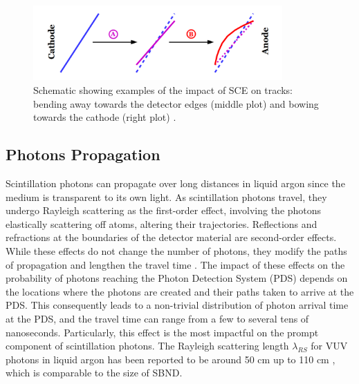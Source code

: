 \begin{figure}[htbp] 
\centering    
\includegraphics[width=0.85\textwidth]{SCE}
\caption[SCE]{
Schematic showing examples of the impact of SCE on tracks: bending away towards the detector edges (middle plot) and bowing towards the cathode (right plot) \cite{SCE}.
}
\label{fig:SCE}
\end{figure}


\subsection{Photons Propagation}
\label{sec:photonprop}


Scintillation photons can propagate over long distances in liquid argon since the medium is transparent to its own light.
As scintillation photons travel, they undergo Rayleigh scattering as the first-order effect, involving the photons elastically scattering off atoms, altering their trajectories. 
Reflections and refractions at the boundaries of the detector material are second-order effects. 
While these effects do not change the number of photons, they modify the paths of propagation and lengthen the travel time \cite{sbnd_pds_paper}. 
The impact of these effects on the probability of photons reaching the Photon Detection System (PDS) depends on the locations where the photons are created and their paths taken to arrive at the PDS. 
This consequently leads to a non-trivial distribution of photon arrival time at the PDS, and the travel time can range from a few to several tens of nanoseconds.
Particularly, this effect is the most impactful on the prompt component of scintillation photons.
The Rayleigh scattering length $\lambda_{RS}$ for VUV photons in liquid argon has been reported to be around 50 cm \cite{rayleigh50} up to 110 cm \cite{rayleigh110}, which is comparable to the size of SBND.

